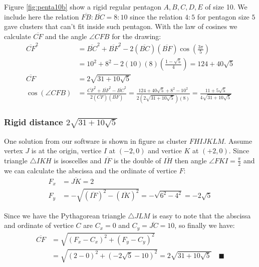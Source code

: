 \documentclass[11pt]{article}
\begin{document}
Figure \ref{fig:penta10b} show a rigid regular pentagon $A,B,C,D,E$ of size 10. We include here the relation $\overline{FB}:\overline{BC} = 8:10$ since the relation $4:5$ for pentagon size $5$ gave clusters that can't fit inside such pentagon. With the law of cosines we calculate $\overline{CF}$ and
the angle $\angle{CFB}$ for the drawing:
\begin{align}
\overline{CF}^2 &= \overline{BC}^2 + \overline{BF}^2
 - 2(\overline{BC})(\overline{BF})\cos\left(\frac{3\pi}5\right) \nonumber\\
 &= 10^2 + 8^2 - 2(10)(8)\left(\frac{1-\sqrt5}4\right) = 124 + 40\sqrt5 \nonumber\\
\overline{CF} &= 2\sqrt{31 + 10\sqrt5} \\
\cos(\angle{CFB}) &= \frac{\overline{CF}^2 + \overline{BF}^2 - \overline{BC}^2}
 {2(\overline{CF})(\overline{BF})}%
 = \frac{124+40\sqrt5 + 8^2 - 10^2}{2(2\sqrt{31 + 10\sqrt5})(8)}
  = \frac{11 + 5\sqrt5}{4\sqrt{31+10\sqrt5}}
\end{align}

\subsubsection{Rigid distance $2\sqrt{31 + 10\sqrt5}$}

One solution from our software is shown in figure as cluster $FHIJKLM$. Assume vertex $J$ is at the origin, vertice $I$ at $(-2,0)$ and vertice $K$ at $(+2,0)$. Since triangle $\triangle{IKH}$ is isoscelles and $\overline{IF}$ is the double of $\overline{IH}$ then angle $\angle{FKI} = \frac{\pi}2$ and we can calculate the abscissa and the ordinate of vertice $F$:
\begin{align}
F_x &= \overline{JK} = 2\\
F_y &= -\sqrt{(\overline{IF})^2 - (\overline{IK})^2} = -\sqrt{6^2 - 4^2} = -2\sqrt5
\end{align}

Since we have the Pythagorean triangle $\triangle{JLM}$ is easy to note that the abscissa and ordinate of vertice $C$ are $C_x = 0$ and $C_y = \overline{JC} = 10$, so finally we have:
\begin{align}
\overline{CF} &= \sqrt{(F_x - C_x)^2 + (F_y - C_y)^2} \nonumber\\
 &= \sqrt{(2 - 0)^2 + (-2\sqrt5 - 10)^2 } = 2\sqrt{31 + 10\sqrt5} \quad\blacksquare
\end{align}

\end{document}
